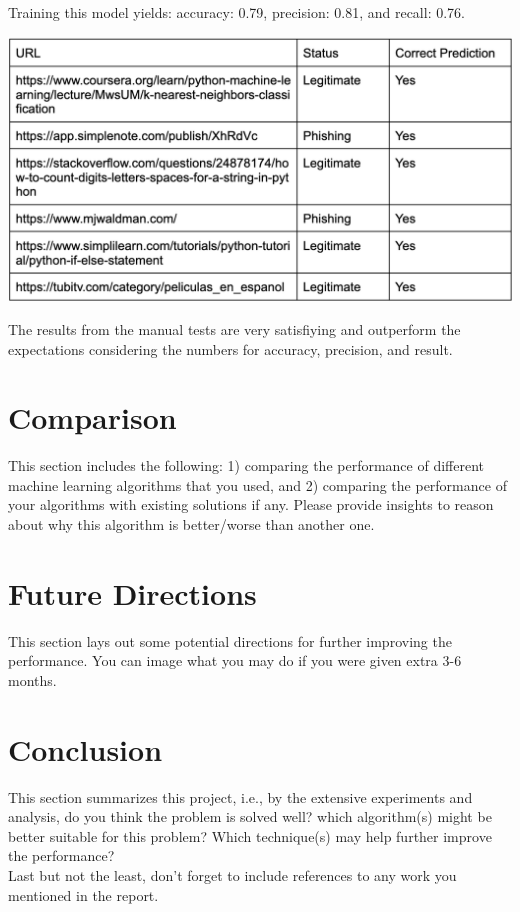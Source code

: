 \documentclass[conference]{IEEEtran}
\begin{document}
Training this model yields: accuracy: 0.79, precision: 0.81, and recall: 0.76.

\includegraphics{knnManualTest.png}

The results from the manual tests are very satisfiying and outperform the expectations considering the numbers for accuracy, precision, and result. 


\section{Comparison}  
This section includes the following: 1) comparing the performance of different machine learning algorithms that you used, and 2) comparing the performance of your algorithms with existing solutions if any. Please provide insights to reason about why this algorithm is better/worse than another one.

\section{Future Directions}
This section lays out some potential directions for further improving the performance. You can image what you may do if you were given extra 3-6 months.

\section{Conclusion}
This section summarizes this project, i.e., by the extensive experiments and analysis, do you think the problem is solved well? which algorithm(s) might be better suitable for this problem? Which technique(s) may help further improve the performance? \\

Last but not the least, don't forget to include references to any work you mentioned in the report.
  



\end{document}
